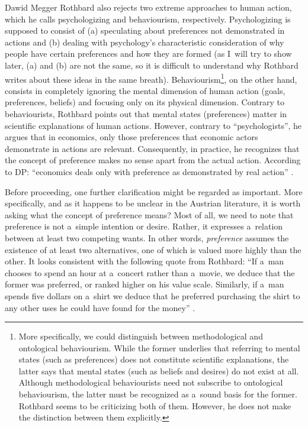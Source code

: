 \begin{artengenv}{Dawid Megger}
Rothbard also rejects two extreme approaches to human action, which he calls psychologizing and behaviourism, respectively. Psychologizing is supposed to consist of (a) speculating about preferences not demonstrated in actions and (b) dealing with psychology's characteristic consideration of why people have certain preferences and how they are formed (as I~will try to show later, (a) and (b) are not the same, so it is difficult to understand why Rothbard writes about these ideas in the same breath). Behaviourism\footnote{More specifically, we could distinguish between methodological and ontological behaviourism. While the former underlies that referring to mental states (such as preferences) does not constitute scientific explanations, the latter says that mental states (such as beliefs and desires) do not exist at all. Although methodological behaviourists need not subscribe to ontological behaviourism, the latter must be recognized as a~sound basis for the former. Rothbard 
\parencite*[][p.297]{rothbard_present_2011} %
 seems to be criticizing both of them. However, he does not make the distinction between them explicitly.}, on the other hand, consists in completely ignoring the mental dimension of human action (goals, preferences, beliefs) and focusing only on its physical dimension. Contrary to behaviourists, Rothbard points out that mental states (preferences) matter in scientific explanations of human actions. However, contrary to ``psychologists'', he argues that in economics, only those preferences that economic actors demonstrate in actions are relevant. Consequently, in practice, he recognizes that the concept of preference makes no sense apart from the actual action. According to DP: ``economics deals only with preference as demonstrated by real action'' 
\parencite[][p.333]{rothbard_present_2011}.%




Before proceeding, one further clarification might be regarded as important. More specifically, and as it happens to be unclear in the Austrian literature, it is worth asking what the concept of preference means? Most of all, we need to note that preference is not a~simple intention or desire. Rather, it expresses a~relation between at least two competing wants. In other words, \textit{preference} assumes the existence of at least two alternatives, one of which is valued more highly than the other. It looks consistent with the following quote from Rothbard: ``If a~man chooses to spend an hour at a~concert rather than a~movie, we deduce that the former was preferred, or ranked higher on his value scale. Similarly, if a~man spends five dollars on a~shirt we deduce that he preferred purchasing the shirt to any other uses he could have found for the money'' 
\parencite[][p.290]{rothbard_present_2011}.%





\end{artengenv}
